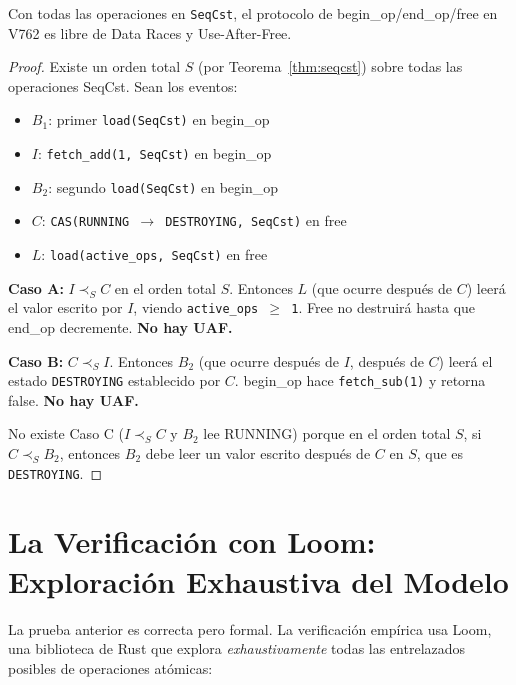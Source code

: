 \begin{theorem}
\label{thm:quiescence}
Con todas las operaciones en \texttt{SeqCst}, el protocolo de begin\_op/end\_op/free
en V762 es libre de Data Races y Use-After-Free.
\end{theorem}

\begin{proof}
Existe un orden total $S$ (por Teorema~\ref{thm:seqcst}) sobre todas las operaciones
SeqCst. Sean los eventos:
\begin{itemize}
\item $B_1$: primer \texttt{load(SeqCst)} en begin\_op
\item $I$: \texttt{fetch\_add(1, SeqCst)} en begin\_op
\item $B_2$: segundo \texttt{load(SeqCst)} en begin\_op
\item $C$: \texttt{CAS(RUNNING $\to$ DESTROYING, SeqCst)} en free
\item $L$: \texttt{load(active\_ops, SeqCst)} en free
\end{itemize}

\textbf{Caso A:} $I \prec_S C$ en el orden total $S$.
Entonces $L$ (que ocurre después de $C$) leerá el valor escrito por $I$,
viendo \texttt{active\_ops $\ge$ 1}. Free no destruirá hasta que end\_op decremente.
\textbf{No hay UAF.}

\textbf{Caso B:} $C \prec_S I$.
Entonces $B_2$ (que ocurre después de $I$, después de $C$) leerá el estado
\texttt{DESTROYING} establecido por $C$. begin\_op hace \texttt{fetch\_sub(1)} y retorna false.
\textbf{No hay UAF.}

No existe Caso C ($I \prec_S C$ y $B_2$ lee RUNNING) porque en el orden total $S$,
si $C \prec_S B_2$, entonces $B_2$ debe leer un valor escrito después de $C$ en $S$,
que es \texttt{DESTROYING}.
\end{proof}

\section{La Verificación con Loom: Exploración Exhaustiva del Modelo}

La prueba anterior es correcta pero formal. La verificación empírica usa Loom,
una biblioteca de Rust que explora \textit{exhaustivamente} todas las
entrelazados posibles de operaciones atómicas:

